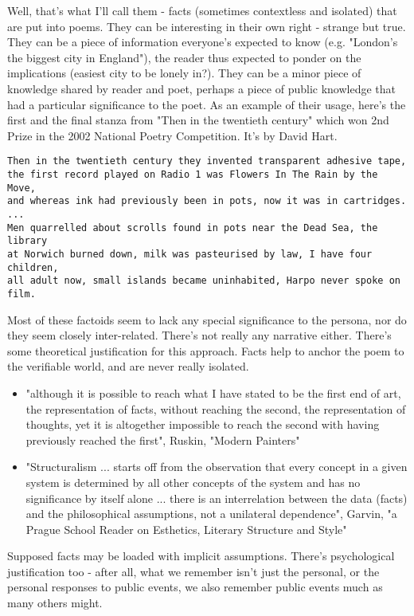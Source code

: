 \documentclass[11pt]{article}
\begin{document}
Well, that's what I'll call them - facts (sometimes contextless and isolated) that are put into poems. They can be interesting in their own right - strange but true. They can be a piece of information everyone's expected to know (e.g. "London's the biggest city in England"), the reader thus expected to ponder on the implications (easiest city to be lonely in?). They can be a minor piece of knowledge shared by reader and poet, perhaps a piece of public knowledge that had a particular significance to the poet. As an example of their usage, here's the first and the final stanza from "Then in the twentieth century" which won 2nd Prize in the 2002 National Poetry Competition. It's by David Hart.
\begin{verbatim}
Then in the twentieth century they invented transparent adhesive tape,
the first record played on Radio 1 was Flowers In The Rain by the Move,
and whereas ink had previously been in pots, now it was in cartridges.
...
Men quarrelled about scrolls found in pots near the Dead Sea, the library
at Norwich burned down, milk was pasteurised by law, I have four children,
all adult now, small islands became uninhabited, Harpo never spoke on film.
\end{verbatim}
Most of these factoids seem to lack any special significance to the persona, nor do they seem closely inter-related. There's not really any narrative either. There's some theoretical justification for this approach. Facts help to anchor the poem to the verifiable world, and are never really isolated.
\begin{itemize}
\item    "although it is possible to reach what I have stated to be the first end of art, the representation of facts, without reaching the second, the representation of thoughts, yet it is altogether impossible to reach the second with having previously reached the first", Ruskin, "Modern Painters"
\item    "Structuralism ... starts off from the observation that every concept in a given system is determined by all other concepts of the system and has no significance by itself alone ... there is an interrelation between the data (facts) and the philosophical assumptions, not a unilateral dependence", Garvin, "a Prague School Reader on Esthetics, Literary Structure and Style"
\end{itemize}
Supposed facts may be loaded with implicit assumptions. There's psychological justification too - after all, what we remember isn't just the personal, or the personal responses to public events, we also remember public events much as many others might.
\end{document}
